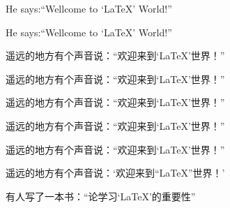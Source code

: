 \documentclass{article}
\begin{document}
He says:\enquote{Wellcome to \enquote{\LaTeX{}} World!}

He says:\enquote{Wellcome to \enquote{\LaTeX{}} World!}

遥远的地方有个声音说：\enquote{欢迎来到\enquote{\LaTeX{}}世界！}

遥远的地方有个声音说：\enquote{欢迎来到\enquote{\LaTeX{}}世界！}

遥远的地方有个声音说：\enquote{欢迎来到\enquote{\LaTeX{}}世界！}

遥远的地方有个声音说：\enquote{欢迎来到\enquote{\LaTeX{}}世界！}

遥远的地方有个声音说：“欢迎来到‘\LaTeX{}’世界！”

遥远的地方有个声音说：‘欢迎来到“\LaTeX{}”世界！’

有人写了一本书：\enquote{论学习\enquote{\LaTeX{}}的重要性}
\end{document}
